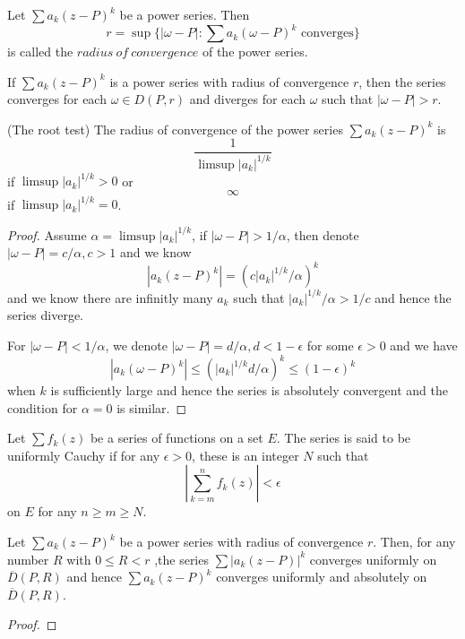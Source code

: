 \documentclass[lang=en, color=blue, ]{elegantbook}
\begin{document}
\begin{definition}
    Let $\sum a_k(z-P)^k$ be a power series. Then
    \[r = \sup\{|\omega-P|:\sum a_k(\omega-P)^k\text{ converges}\}\]
    is called the $radius\ of\ convergence$ of the power series.
\end{definition}

\begin{lemma}
    If $\sum a_k(z-P)^k$ is a power series with radius of convergence $r$, then the series converges for each $\omega \in D({P,r})$ and diverges for each $\omega$ such that $|\omega-P|>r$.
\end{lemma}

\begin{lemma}
    (The root test) The radius of convergence of the power series $\sum a_k(z-P)^k$ is
    \[\dfrac{1}{\limsup |a_k|^{1/k}}\]
    if $\limsup |a_k|^{1/k} > 0$ or
    \[\infty\]
    if $\limsup |a_k|^{1/k} = 0$.
\end{lemma}
\begin{proof}\par
    Assume $\alpha = \limsup |a_k|^{1/k}$, if $|\omega-P|>1/\alpha$, then denote $|\omega-P| = c/\alpha,c>1$ and we know
    \[
    |a_k(z-P)^k| = (c|a_k|^{1/k}/\alpha)^k
    \]    
    and we know there are infinitly many $a_k$ such that $|a_k|^{1/k}/\alpha > 1/c$ and hence the series diverge.\par
    For $|\omega-P|<1/\alpha$, we denote $|\omega-P| = d/\alpha, d<1-\epsilon$ for some $\epsilon >0$ and we have
    \[
    |a_k(\omega-P)^k| \leq (|a_k|^{1/k}d/\alpha)^k \leq (1-\epsilon)^k 
    \]
    when $k$ is sufficiently large and hence the series is absolutely convergent and the condition for $\alpha = 0$ is similar.
\end{proof}

\begin{definition}
    Let $\sum f_k(z)$ be a series of functions on a set $E$. The series is said to be uniformly Cauchy if for any $\epsilon > 0$, these is an integer $N$ such that
    \[
    |\sum\limits_{k=m}^{n} f_k(z)| <\epsilon
    \]
    on $E$ for any $n\geq m \geq N$.
\end{definition}

\begin{proposition}
    Let $\sum a_k(z-P)^k$ be a power series with radius of convergence $r$. Then, for any number $R$ with $0 \leq R < r$ ,the series $\sum |a_k(z-P)|^k$ converges uniformly on $\overline{D}(P,R)$ and hence $\sum a_k(z-P)^k$ converges uniformly and absolutely on $\overline{D}(P,R)$.
\end{proposition}
\begin{proof}

\end{proof}
\end{document}
